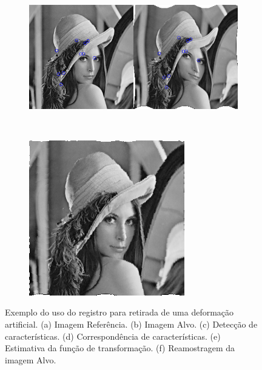 \begin{figure}[H]
\begin{subfigure}[t]{0.3\textwidth}
      \label{fig:sin-image}
    \end{subfigure} \\
    \begin{subfigure}[t]{0.64\textwidth}
      \includegraphics[width=\textwidth]{figuras/Features.png}
      \label{fig:dist-image}
    \end{subfigure} \\
    \begin{subfigure}[t]{0.3\textwidth}
      \includegraphics[width=\textwidth]{figuras/lenaRegistrada.png}
      \label{fig:lenaRegistrada}
    \end{subfigure}
    \caption{Exemplo do uso do registro para retirada de uma deformação artificial.
             (a) Imagem Referência. (b) Imagem Alvo. (c) Detecção de características.
             (d) Correspondência de características. (e) Estimativa da função de transformação.
             (f) Reamostragem da imagem Alvo.}
    \label{fig:regExplicacao}
\end{figure}


